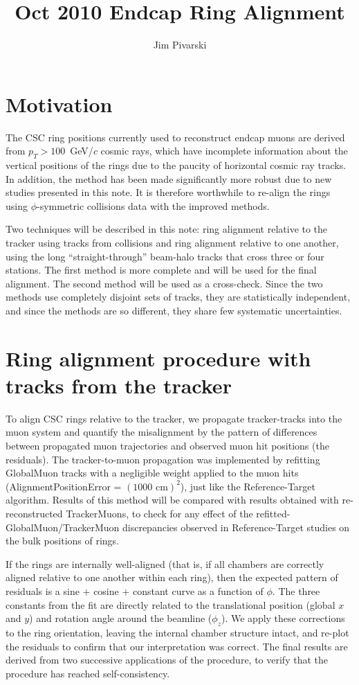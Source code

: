 \documentclass[12pt]{article}
\title{Oct 2010 Endcap Ring Alignment}
\author{Jim Pivarski}
\begin{document}
\maketitle
\tableofcontents

\section{Motivation}

The CSC ring positions currently used to reconstruct endcap muons are
derived from $p_T > 100$~GeV/$c$ cosmic rays, which have incomplete
information about the vertical positions of the rings due to the
paucity of horizontal cosmic ray tracks.  In addition, the method has
been made significantly more robust due to new studies presented in
this note.  It is therefore worthwhile to re-align the rings using
$\phi$-symmetric collisions data with the improved methods.

Two techniques will be described in this note: ring alignment relative
to the tracker using tracks from collisions and ring alignment
relative to one another, using the long ``straight-through'' beam-halo
tracks that cross three or four stations.  The first method is more
complete and will be used for the final alignment.  The second method
will be used as a cross-check.  Since the two methods use completely
disjoint sets of tracks, they are statistically independent, and since
the methods are so different, they share few systematic uncertainties.

\section{Ring alignment procedure with tracks from the tracker}
\label{sec:trackertorings}

To align CSC rings relative to the tracker, we propagate
tracker-tracks into the muon system and quantify the misalignment by
the pattern of differences between propagated muon trajectories and
observed muon hit positions (the residuals).  The tracker-to-muon
propagation was implemented by refitting GlobalMuon tracks with a
negligible weight applied to the muon hits (AlignmentPositionError =
$(\mbox{1000 cm})^2$), just like the Reference-Target algorithm.
Results of this method will be compared with results obtained with
re-reconstructed TrackerMuons, to check for any effect of the
refitted-GlobalMuon/TrackerMuon discrepancies observed in
Reference-Target studies on the bulk positions of rings.

If the rings are internally well-aligned (that is, if all chambers are
correctly aligned relative to one another within each ring), then the
expected pattern of residuals is a sine $+$ cosine $+$ constant curve
as a function of $\phi$.  The three constants from the fit are
directly related to the translational position (global $x$ and $y$)
and rotation angle around the beamline ($\phi_z$).  We apply these
corrections to the ring orientation, leaving the internal chamber
structure intact, and re-plot the residuals to confirm that our
interpretation was correct.  The final results are derived from two
successive applications of the procedure, to verify that the procedure
has reached self-consistency.
\end{document}
